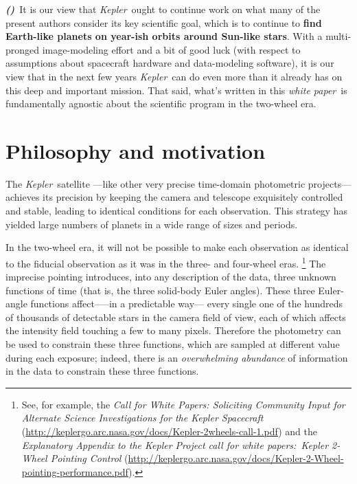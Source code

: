 \documentclass[letterpaper,12pt,whitepaper]{haastex}
\newcommand{\documentname}{\textsl{white paper}}
\newcommand{\observatory}[1]{\textsl{#1}}
\newcommand{\Kepler}{\observatory{Kepler}}
\newcounter{inlineitem}
\newcommand{\binlineitem}{\refstepcounter{inlineitem}\textbf{\textsl{(\theinlineitem)}}}
\begin{document}
\binlineitem~It is our view that \Kepler\ ought to continue work on
  what many of the present authors consider its key scientific goal,
  which is to continue to \textbf{find Earth-like planets on year-ish orbits around Sun-like stars}.
With a multi-pronged image-modeling effort and
  a bit of good luck
  (with respect to assumptions about spacecraft hardware and data-modeling software),
  it is our view that in the next few years \Kepler\ can do even more
  than it already has on this deep and important mission.
That said, what's written in this \documentname\ is fundamentally
  agnostic about the scientific program in the two-wheel era.

\clearpage
\section{Philosophy and motivation}

The \Kepler\ satellite%
  ---like other very precise time-domain photometric projects---%
  achieves its precision by keeping the camera and telescope exquisitely controlled and stable,
  leading to identical conditions for each observation.
This strategy has yielded large numbers of planets in a wide range of sizes and periods.

In the two-wheel era, it will not be possible
  to make each observation as identical to the fiducial observation
  as it was in the three- and four-wheel eras.%
  \footnote{See, for example, the
  \textit{Call for White Papers: Soliciting Community Input for Alternate Science Investigations for the Kepler Spacecraft}
  (\url{http://keplergo.arc.nasa.gov/docs/Kepler-2wheels-call-1.pdf})
  and the
  \textit{Explanatory Appendix to the Kepler Project call for white papers:\ Kepler 2-Wheel Pointing Control}
  (\url{http://keplergo.arc.nasa.gov/docs/Kepler-2-Wheel-pointing-performance.pdf}).}
The imprecise pointing introduces, into any description of the data, three unknown functions of time
  (that is, the three solid-body Euler angles).
These three Euler-angle functions affect—--in a predictable way---%
  every single one of the hundreds of thousands of detectable stars
  in the camera field of view,
  each of which affects the intensity field touching a few to many pixels.
Therefore the photometry can be used to constrain these three functions,
  which are sampled at different value during each exposure;
  indeed, there is an \emph{overwhelming abundance} of information in the data
  to constrain these three functions.
\end{document}
